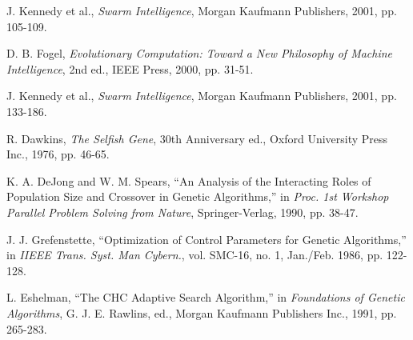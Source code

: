 \begin{thebibliography}{9}
J. Kennedy et al., \textit{Swarm Intelligence}, Morgan Kaufmann Publishers, 2001, pp. 105-109.

D. B. Fogel, \textit{Evolutionary Computation: Toward a New Philosophy of Machine Intelligence}, 2nd ed., IEEE Press, 2000, pp. 31-51.

J. Kennedy et al., \textit{Swarm Intelligence}, Morgan Kaufmann Publishers, 2001, pp. 133-186.


R. Dawkins, \textit{The Selfish Gene}, 30th Anniversary ed., Oxford University Press Inc., 1976, pp. 46-65.  

K. A. DeJong and W. M. Spears, ``An Analysis of the Interacting Roles of Population Size and Crossover in Genetic Algorithms,'' in \textit{Proc. 1st Workshop Parallel Problem Solving from Nature}, Springer-Verlag, 1990, pp. 38-47.


J. J. Grefenstette, ``Optimization of Control Parameters for Genetic Algorithms,'' in \textit{IIEEE Trans. Syst. Man Cybern.}, vol. SMC-16, no. 1, Jan./Feb. 1986, pp. 122-128.


L. Eshelman, ``The CHC Adaptive Search Algorithm,'' in \textit{Foundations of Genetic Algorithms}, G. J. E. Rawlins, ed., Morgan Kaufmann Publishers Inc., 1991, pp. 265-283.



\end{thebibliography}
